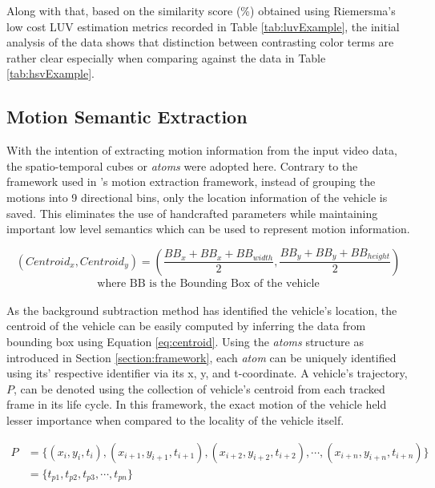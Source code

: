 Along with that, based on the similarity score (\%) obtained using Riemersma's low cost LUV estimation metrics recorded in Table \ref{tab:luvExample}, the initial analysis of the data shows that distinction between contrasting color terms are rather clear especially when comparing against the data in Table \ref{tab:hsvExample}. 



\subsection{Motion Semantic Extraction}

With the intention of extracting motion information from the input video data, the spatio-temporal cubes or \emph{atoms} were adopted here. Contrary to the framework used in \versionOne's motion extraction framework, instead of grouping the motions into 9 directional bins, only the location information of the vehicle is saved. This eliminates the use of handcrafted parameters while maintaining important low level semantics which can be used to represent motion information.


\begin{equation}
\label{eq:centroid}
(Centroid_x, Centroid_y) = (\frac{BB_{x}+BB_{x}+BB_{width}}{2} , \frac{BB_{y}+BB_{y}+BB_{height}}{2})
\end{equation}
\vspace{-2em}
\begin{align*}
    \text{where BB is the Bounding Box of the vehicle}
\end{align*}

As the background subtraction method has identified the vehicle's location, the centroid of the vehicle can be easily computed by inferring the data from bounding box using Equation \ref{eq:centroid}. Using the \emph{atoms} structure as introduced in Section \ref{section:framework}, each \emph{atom} can be uniquely identified using its' respective identifier via its x, y, and t-coordinate. A vehicle's trajectory, $P$, can be denoted using the collection of  vehicle's centroid from each tracked frame in its life cycle. In this framework, the exact motion of the vehicle held lesser importance when compared to the locality of the vehicle itself. 

\begin{align}
    P &= \{ (x_i, y_i, t_i), (x_{i+1}, y_{i+1}, t_{i+1}), (x_{i+2}, y_{i+2}, t_{i+2}), \dotsb,(x_{i+n}, y_{i+n}, t_{i+n})\}  \nonumber \\
      &= \{ t_{p1}, t_{p2}, t_{p3}, \dotsb, t_{pn}\}
\end{align}


